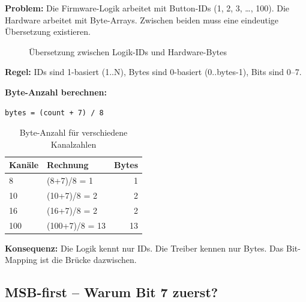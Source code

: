 \textbf{Problem:} Die Firmware-Logik arbeitet mit Button-IDs (1, 2, 3, \ldots, 100). Die Hardware arbeitet mit Byte-Arrays. Zwischen beiden muss eine eindeutige Übersetzung existieren.

\begin{figure}[htbp]
\centering
{}
\caption{Übersetzung zwischen Logik-IDs und Hardware-Bytes}
\label{fig:id-byte-mapping}
\end{figure}

\textbf{Regel:} IDs sind 1-basiert (1..N), Bytes sind 0-basiert (0..bytes-1), Bits sind 0–7.

\textbf{Byte-Anzahl berechnen:}

\begin{lstlisting}[style=arduino,numbers=none]
bytes = (count + 7) / 8
\end{lstlisting}

\begin{table}[htbp]
\centering
\begin{tabular}{@{}llr@{}}
\toprule
\textbf{Kanäle} & \textbf{Rechnung} & \textbf{Bytes} \\
\midrule
8   & (8+7)/8 = 1    & 1 \\
10  & (10+7)/8 = 2   & 2 \\
16  & (16+7)/8 = 2   & 2 \\
100 & (100+7)/8 = 13 & 13 \\
\bottomrule
\end{tabular}
\caption{Byte-Anzahl für verschiedene Kanalzahlen}
\label{tab:byte-anzahl}
\end{table}

\textbf{Konsequenz:} Die Logik kennt nur IDs. Die Treiber kennen nur Bytes. Das Bit-Mapping ist die Brücke dazwischen.

\subsection{MSB-first – Warum Bit 7 zuerst?}

